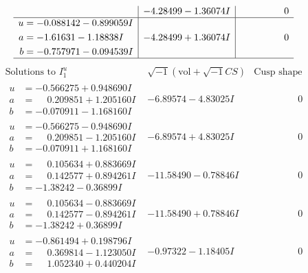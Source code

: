 \documentclass[1p]{elsarticle_modified}
\theoremstyle{definition}
\newcommand{\I}{\sqrt{-1}}
\begin{document}
$$\begin{array}{c|c|c}
 & -4.28499 - 1.36074 I & \phantom{-0.000000 } 0 \\ \hline\begin{aligned}
u &= -0.088142 - 0.899059 I \\
a &= -1.61631 - 1.18838 I \\
b &= -0.757971 - 0.094539 I\end{aligned}
 & -4.28499 + 1.36074 I & \phantom{-0.000000 } 0\\
 \hline 
 \end{array}$$\newpage$$\begin{array}{c|c|c}  
\text{Solutions to }I^u_{1}& \I (\text{vol} + \sqrt{-1}CS) & \text{Cusp shape}\\
 \hline 
\begin{aligned}
u &= -0.566275 + 0.948690 I \\
a &= \phantom{-}0.209851 + 1.205160 I \\
b &= -0.070911 - 1.168160 I\end{aligned}
 & -6.89574 - 4.83025 I & \phantom{-0.000000 } 0 \\ \hline\begin{aligned}
u &= -0.566275 - 0.948690 I \\
a &= \phantom{-}0.209851 - 1.205160 I \\
b &= -0.070911 + 1.168160 I\end{aligned}
 & -6.89574 + 4.83025 I & \phantom{-0.000000 } 0 \\ \hline\begin{aligned}
u &= \phantom{-}0.105634 + 0.883669 I \\
a &= \phantom{-}0.142577 + 0.894261 I \\
b &= -1.38242 - 0.36899 I\end{aligned}
 & -11.58490 - 0.78846 I & \phantom{-0.000000 } 0 \\ \hline\begin{aligned}
u &= \phantom{-}0.105634 - 0.883669 I \\
a &= \phantom{-}0.142577 - 0.894261 I \\
b &= -1.38242 + 0.36899 I\end{aligned}
 & -11.58490 + 0.78846 I & \phantom{-0.000000 } 0 \\ \hline\begin{aligned}
u &= -0.861494 + 0.198796 I \\
a &= \phantom{-}0.369814 - 1.123050 I \\
b &= \phantom{-}1.052340 + 0.440204 I\end{aligned}
 & -0.97322 - 1.18405 I & \phantom{-0.000000 } 0 \\ \hline\begin{aligned}

\end{aligned}
\end{array}$$
\end{document}
